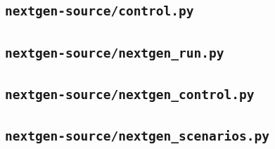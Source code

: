 \subsection*{\texttt{nextgen-source/control.py}}
\subsection*{\texttt{nextgen-source/nextgen\_run.py}}
\subsection*{\texttt{nextgen-source/nextgen\_control.py}}
\subsection*{\texttt{nextgen-source/nextgen\_scenarios.py}}
